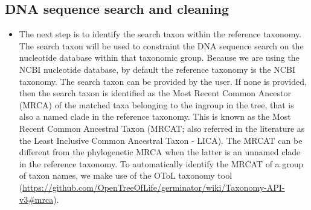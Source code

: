 \documentclass[]{article}
\begin{document}
\hypertarget{dna-sequence-search-and-cleaning}{%
\subsection{DNA sequence search and cleaning}\label{dna-sequence-search-and-cleaning}}

\begin{itemize}
\item
  The next step is to identify the search taxon within the reference taxonomy. The search taxon will be used to constraint the DNA sequence search on the nucleotide database within that taxonomic group. Because we are using the NCBI nucleotide database, by default the reference taxonomy is the NCBI taxonomy. The search taxon can be provided by the user. If none is provided, then the search taxon is identified as the Most Recent Common Ancestor (MRCA) of the
  matched taxa belonging to the ingroup in the tree, that is also a named clade in the reference taxonomy. This is known as the Most Recent Common
  Ancestral Taxon (MRCAT; also referred in the literature as the Least Inclusive Common Ancestral Taxon - LICA).
  The MRCAT can be different from the phylogenetic MRCA when the latter is an unnamed clade in the reference taxonomy.
  To automatically identify the MRCAT of a group of taxon names, we make use of the OToL taxonomy tool (\url{https://github.com/OpenTreeOfLife/germinator/wiki/Taxonomy-API-v3\#mrca}).


\end{itemize}
\end{document}
